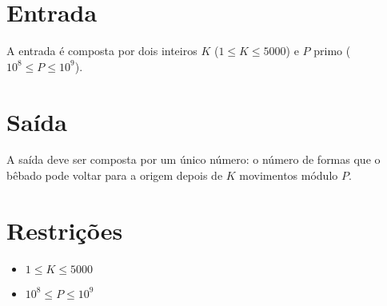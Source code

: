 %

\section*{Entrada}

A entrada é composta por dois inteiros $K$ ($1 \leq K \leq 5000$) e $P$ primo ($10^8 \leq P \leq 10^9$).

%
%

\section*{Saída}

A saída deve ser composta por um único número: o número de formas que o bêbado pode voltar para a origem depois de $K$ movimentos módulo $P$.

\section*{Restrições}

\begin{itemize}
\item $ 1 \leq K \leq 5000$
\item $10^8 \leq P \leq 10^9$
\end{itemize}


\exemplo
